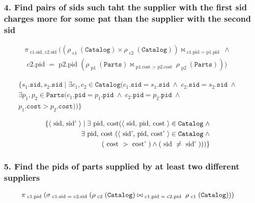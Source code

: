 \subsubsection{4. Find pairs of sids such taht the supplier with the first sid charges more for some pat than the supplier with the second sid}

\begin{align*}
  \pi_{\text{ c1.sid, c2.sid }}((\rho_{\text{ c1 }}(\mathtt{Catalog}) \times \rho_{\text{ c2 }}(\mathtt{Catalog})) \bowtie_{\text{ c1.pid } = \text{ p1.pid }} \wedge \\ 
  \text{ c2.pid } = \text{ p2.pid }(\rho_{\text{ p1 }}(\mathtt{Parts}) \bowtie_{\text{ p1.cost } > \text{ p2.cost }} \rho_{\text{ p2 }}(\mathtt{Parts})))
\end{align*}

\begin{align*}
  \{s_1.\mathtt{sid}, s_2.\mathtt{sid} \; | \; \exists c_1, c_2 \in \mathtt{Catalog}
  (c_1.\mathtt{sid} = s_1.\mathtt{sid} \; \wedge \; c_2.\mathtt{sid} = s_2.\mathtt{sid} \; \wedge \\
  \exists p_1, p_2 \in \mathtt{Parts} (c_1.\mathtt{pid} = p_1.\mathtt{pid} \; \wedge \; c_2.\mathtt{pid} = p_2.\mathtt{pid} \; \wedge \\
  p_1.\mathtt{cost} > p_2.\mathtt{cost}))\}
\end{align*}

\begin{align*}
  \{\langle \text{ sid, sid' } \rangle 
    \mid \exists \text{ pid, cost} (\langle \text{ sid, pid, cost } \rangle \in \mathtt{Catalog} \; \wedge \\
    \exists \text{ pid, cost } (\langle \text{ sid', pid, cost' } \rangle \in \mathtt{Catalog} \; \wedge \\
  (\text{ cost } > \text{ cost' }) \wedge (\text{ sid } \neq \text{ sid' })))\}
\end{align*}

\subsubsection{5. Find the pids of parts supplied by at least two different suppliers}

\begin{align*}
  \pi_{\text{ c1.pid }}(\sigma_{\text{ c1.sid }=\text{ c2.sid }}(\rho_{\text{ c2 }}(\mathtt{Catalog}) \bowtie_{\text{ c1.pid } = \text{ c2.pid }} \rho_{\text{ c1 }}(\mathtt{Catalog})))
\end{align*}

